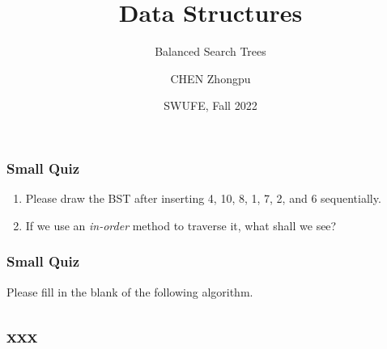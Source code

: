 \documentclass[aspectratio=169, 14pt]{beamer}
\title[Data Structures] %
{Data Structures}
\subtitle{Balanced Search Trees}
\author[CHEN Zhongpu] %
{CHEN Zhongpu}
\institute[] %
{
  School of Computing and Artificial Intelligence \\
  \href{mailto:zpchen@swufe.edu.cn}{zpchen@swufe.edu.cn}
}
\date[] %
{SWUFE, Fall 2022}
\begin{document}
\frame{\titlepage}

\begin{frame}
    \frametitle{Small Quiz}
\begin{enumerate}
    \item Please draw the BST after inserting 4, 10, 8, 1, 7, 2, and 6 sequentially.
    \item If we use an \emph{in-order} method to traverse it, what shall we see?
\end{enumerate}   

\end{frame}

\begin{frame}
    \frametitle{Small Quiz}

Please fill in the blank of the following algorithm.

    

\end{frame}

{
    \begin{frame}
        \section{\textcolor{darkmidnightblue}{xxx}}
    \end{frame}

}
\end{document}
